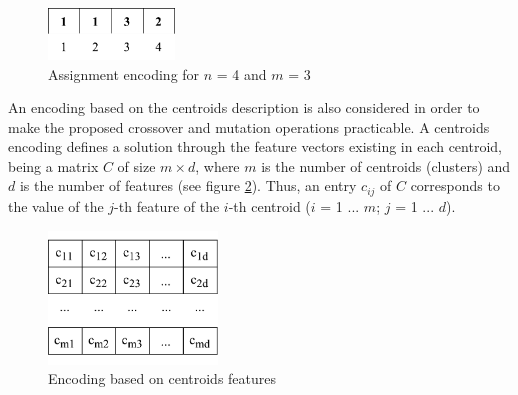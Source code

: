 \begin{figure}[h]
  \begin{center}
    \includegraphics[width=0.3\textwidth]{img/assignment-encoding}
    \caption{Assignment encoding for $n$ = 4 and $m$ = 3}\label{fig:assignment-encoding}
  \end{center}
\end{figure}

An encoding based on the centroids description is also considered in order to make the proposed crossover and mutation operations practicable. A centroids encoding defines a solution through the feature vectors existing in each centroid, being a matrix $C$ of size $m \times d$, where $m$ is the number of centroids (clusters) and $d$ is the number of features (see figure \ref{fig:centroids-encoding}). Thus, an entry $c_{ij}$ of $C$ corresponds to the value of the $j$-th feature of the $i$-th centroid ($i$ = 1 ... $m$; $j$ = 1 ... $d$).


\begin{figure}[h]
  \begin{center}
    \includegraphics[width=0.4\textwidth]{img/centroids-encoding}
    \caption{Encoding based on centroids features}\label{fig:centroids-encoding}
  \end{center}
\end{figure}


